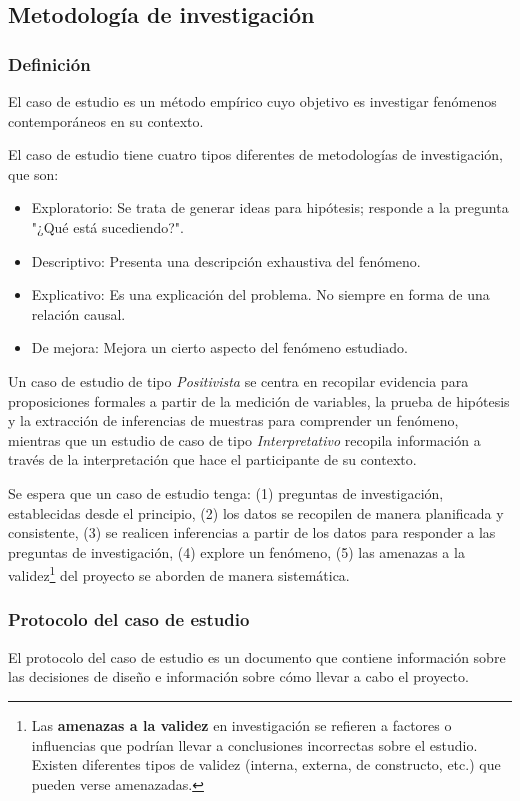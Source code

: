 \subsection{Metodología de investigación}
\subsubsection{Definición}
El caso de estudio es un método empírico cuyo objetivo es investigar fenómenos contemporáneos en su contexto.

El caso de estudio tiene cuatro tipos diferentes de metodologías de investigación, que son:
\begin{itemize}
    \item Exploratorio: Se trata de generar ideas para hipótesis; responde a la pregunta "¿Qué está sucediendo?".
    \item Descriptivo: Presenta una descripción exhaustiva del fenómeno.
    \item Explicativo: Es una explicación del problema.
    No siempre en forma de una relación causal.
    \item De mejora: Mejora un cierto aspecto del fenómeno estudiado.
\end{itemize}

Un caso de estudio de tipo \textit{Positivista} se centra en recopilar evidencia para proposiciones formales a partir de la medición de variables, la prueba de hipótesis y la extracción de inferencias de muestras para comprender un fenómeno, mientras que un estudio de caso de tipo \textit{Interpretativo} recopila información a través de la interpretación que hace el participante de su contexto.

Se espera que un caso de estudio tenga: (1) preguntas de investigación, establecidas desde el principio, (2) los datos se recopilen de manera planificada y consistente, (3) se realicen inferencias a partir de los datos para responder a las preguntas de investigación, (4) explore un fenómeno, (5) las amenazas a la validez\footnote{Las \textbf{amenazas a la validez} en investigación se refieren a factores o influencias que podrían llevar a conclusiones incorrectas sobre el estudio.
Existen diferentes tipos de validez (interna, externa, de constructo, etc.) que pueden verse amenazadas.} del proyecto se aborden de manera sistemática.

\subsubsection{Protocolo del caso de estudio}
El protocolo del caso de estudio es un documento que contiene información sobre las decisiones de diseño e información sobre cómo llevar a cabo el proyecto.

